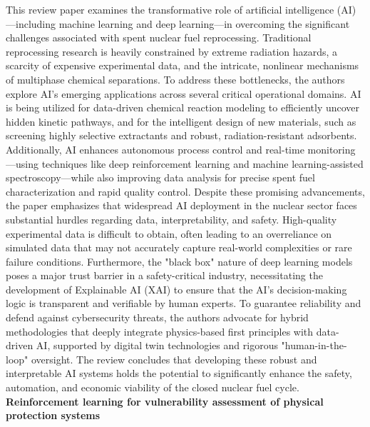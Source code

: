 \documentclass{article}
\begin{document}
This review paper examines the transformative role of artificial intelligence (AI)—including machine learning and deep learning—in overcoming the significant challenges associated with spent nuclear fuel reprocessing. Traditional reprocessing research is heavily constrained by extreme radiation hazards, a scarcity of expensive experimental data, and the intricate, nonlinear mechanisms of multiphase chemical separations. To address these bottlenecks, the authors explore AI's emerging applications across several critical operational domains. AI is being utilized for data-driven chemical reaction modeling to efficiently uncover hidden kinetic pathways, and for the intelligent design of new materials, such as screening highly selective extractants and robust, radiation-resistant adsorbents. Additionally, AI enhances autonomous process control and real-time monitoring—using techniques like deep reinforcement learning and machine learning-assisted spectroscopy—while also improving data analysis for precise spent fuel characterization and rapid quality control.
\newline
Despite these promising advancements, the paper emphasizes that widespread AI deployment in the nuclear sector faces substantial hurdles regarding data, interpretability, and safety. High-quality experimental data is difficult to obtain, often leading to an overreliance on simulated data that may not accurately capture real-world complexities or rare failure conditions. Furthermore, the "black box" nature of deep learning models poses a major trust barrier in a safety-critical industry, necessitating the development of Explainable AI (XAI) to ensure that the AI's decision-making logic is transparent and verifiable by human experts. To guarantee reliability and defend against cybersecurity threats, the authors advocate for hybrid methodologies that deeply integrate physics-based first principles with data-driven AI, supported by digital twin technologies and rigorous "human-in-the-loop" oversight. The review concludes that developing these robust and interpretable AI systems holds the potential to significantly enhance the safety, automation, and economic viability of the closed nuclear fuel cycle.
\newline
\textbf{Reinforcement learning for vulnerability assessment of physical protection systems}
\newline
\end{document}
